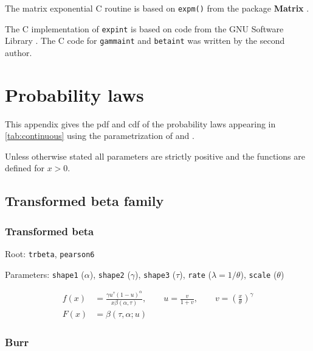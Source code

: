 \documentclass[x11names]{article}
\newcommand{\proglang}[1]{\textsf{#1}}
\newcommand{\pkg}[1]{\textbf{#1}}
\newcommand{\code}[1]{\texttt{#1}}
\begin{document}
The matrix exponential \proglang{C} routine
is based on \code{expm()} from the package \pkg{Matrix} \citep{Matrix}.

The C implementation of \code{expint} is based on code from the GNU
Software Library \citep{GSL}. The \proglang{C} code for
\code{gammaint} and \code{betaint} was written by the second author.





\appendix

\section{Probability laws}
\label{sec:app:continuous}

This appendix gives the pdf and cdf of the probability laws appearing
in \autoref{tab:continuous} using the parametrization of
\cite{LossModels4e} and \cite{HoggKlugman}.

Unless otherwise stated all parameters are strictly positive and the
functions are defined for $x > 0$.

\subsection{Transformed beta family}
\label{sec:appendix:transformed-beta}

\subsubsection*{Transformed beta}

\begin{compactitem}[]
\item Root: \code{trbeta}, \code{pearson6}
\item Parameters: \code{shape1} ($\alpha$),
      \code{shape2} ($\gamma$),
      \code{shape3} ($\tau$),
      \code{rate}   ($\lambda = 1/\theta$),
      \code{scale}  ($\theta$)
\end{compactitem}

\begin{align*}
  f(x) &= \frac{\gamma u^\tau (1 - u)^\alpha}{x \beta
    (\alpha, \tau )},
  \qquad u = \frac{v}{1 + v},
  \qquad v = \left(\frac{x}{\theta} \right)^\gamma \\
  F(x) &= \beta (\tau, \alpha ; u)
\end{align*}

\subsubsection*{Burr}
\end{document}
